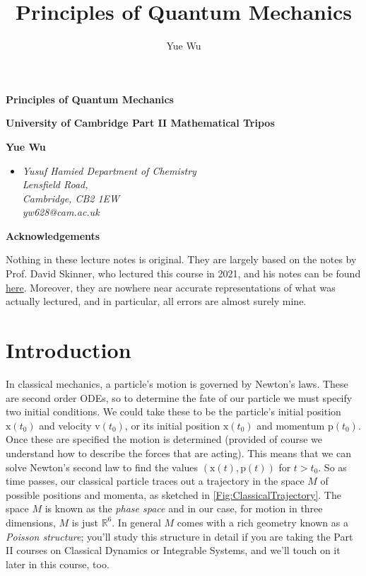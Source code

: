 \documentclass{article}
\title{Principles of Quantum Mechanics}
\author{Yue Wu}
\theoremstyle{plain}\theoremheaderfont{\normalfont\itshape}\theorembodyfont{\rmfamily}\theoremseparator{.}\newtheorem*{rem}{Remark}\newtheorem*{ex}{Example}\newtheorem*{proof}{Proof}\newtheorem*{altp}{Alternative proof}
\theoremstyle{plain}\theoremheaderfont{\normalfont\bfseries}\theorembodyfont{\rmfamily}\theoremseparator{.}\newtheorem{thm}{Theorem}[section]\newtheorem{lem}[thm]{Lemma}\newtheorem{prop}[thm]{Proposition}\newtheorem*{cor}{Corollary}\newtheorem{defn}[thm]{Definition}\newtheorem{clm}[thm]{Claim}\newtheorem{clminproof}{Claim}
\theoremstyle{break}\theoremheaderfont{\normalfont\itshape}\theorembodyfont{\rmfamily}\theoremseparator{.\medskip}\newtheorem*{proofskip}{Proof}\newtheorem*{exs}{Examples}\newtheorem*{rems}{Remarks}
\theoremstyle{break}\theoremheaderfont{\normalfont\bfseries}\theorembodyfont{\rmfamily}\theoremseparator{.\medskip}\newtheorem{lemskip}[thm]{Lemma}\newtheorem{defnskip}[thm]{Definition}\newtheorem{propskip}[thm]{Proposition}\newtheorem{thmskip}[thm]{Theorem}
\numberwithin{equation}{section}
\newcommand{\vb}[1]{\bm{\mathrm{#1}}}
\newcommand{\RR}{\mathbb{R}}
\begin{document}
    \setlength{\parindent}{0pt}
	\Huge\textsf{\textbf{Principles of Quantum Mechanics}}
		
	\Large\textsf{\textbf{University of Cambridge Part II Mathematical Tripos}}

	\noindent\makebox[\linewidth]{\rule{\textwidth}{2pt}}

	\large\textsf{\textbf{Yue Wu}}
	\begin{itemize}[topsep=0pt,leftmargin=15pt]
		\item[] \textit{Yusuf Hamied Department of Chemistry\\
		Lensfield Road,\\
		Cambridge, CB2 1EW}\\

		\textit{yw628@cam.ac.uk}
	\end{itemize}
    \thispagestyle{empty}
    \setlength{\parindent}{15pt}

    \newpage
    \begin{center}
		\textbf{\Large{Acknowledgements}}
	\end{center}
	\large
	Nothing in these lecture notes is original. They are largely based on the notes by Prof. David Skinner, who lectured this course in 2021, and his notes can be found \textcolor{blue}{\href{https://www.damtp.cam.ac.uk/user/dbs26/PQM.html}{here}}. Moreover, they are nowhere near accurate representations of what was actually lectured, and in particular, all errors are almost surely mine.

    \normalsize
	\newpage
	\tableofcontents
	\newpage

    \newpage
    \section{Introduction}
    In classical mechanics, a particle's motion is governed by Newton's laws. These are second order ODEs, so to determine the fate of our particle we must specify two initial conditions. We could take these to be the particle's initial position \(\vb{x}(t_0)\) and velocity \(\vb{v}(t_0)\), or its initial position \(\vb{x}(t_0)\) and momentum \(\vb{p}(t_0)\). Once these are specified the motion is determined (provided of course we understand how to describe the forces that are acting). This means that we can solve Newton's second law to find the values \((\vb{x}(t),\vb{p}(t))\) for \(t>t_0\). So as time passes, our classical particle traces out a trajectory in the space \(M\) of possible positions and momenta, as sketched in \cref{Fig:ClassicalTrajectory}. The space \(M\) is known as the \textit{phase space} and in our case, for motion in three dimensions, \(M\) is just \(\RR^6\). In general \(M\) comes with a rich geometry known as a \textit{Poisson structure}; you'll study this structure in detail if you are taking the Part II courses on Classical Dynamics or Integrable Systems, and we'll touch on it later in this course, too.
\end{document}

